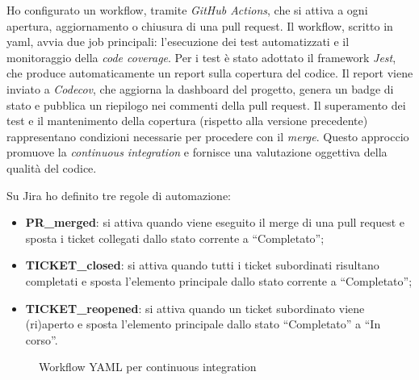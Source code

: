\par Ho configurato un workflow, tramite \textit{GitHub Actions}, che si attiva a ogni apertura, aggiornamento o chiusura di una pull request. Il workflow, scritto in \gls{yaml}, avvia due job principali: l’esecuzione dei test automatizzati e il monitoraggio della \textit{code coverage}. Per i test è stato adottato il framework \textit{Jest}, che produce automaticamente un report sulla copertura del codice. Il report viene inviato a \textit{Codecov}, che aggiorna la dashboard del progetto, genera un badge di stato e pubblica un riepilogo nei commenti della pull request. Il superamento dei test e il mantenimento della copertura (rispetto alla versione precedente) rappresentano condizioni necessarie per procedere con il \textit{merge}. Questo approccio promuove la \textit{continuous integration} e fornisce una valutazione oggettiva della qualità del codice.

\vspace{10pt}
\par\noindent Su Jira ho definito tre regole di automazione:
\begin{itemize}
  \item \textbf{PR\_merged}: si attiva quando viene eseguito il merge di una pull request e sposta i ticket collegati dallo stato corrente a “Completato”;
  \item \textbf{TICKET\_closed}: si attiva quando tutti i ticket subordinati risultano completati e sposta l'elemento principale dallo stato corrente a “Completato”;
  \item \textbf{TICKET\_reopened}: si attiva quando un ticket subordinato viene (ri)aperto e sposta l’elemento principale dallo stato “Completato” a “In corso”.
\end{itemize}

\begin{figure}[H] 
  \centering 
  \caption{Workflow YAML per continuous integration}
\end{figure}